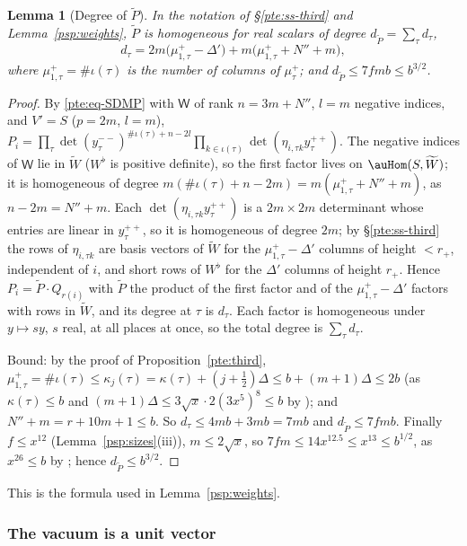 \documentclass[10pt]{amsart}
\newtheorem{lemma}[theorem]{Lemma}
\theoremstyle{definition}
\theoremstyle{remark}
\begin{document}
\begin{lemma}[Degree of $\widetilde P$]\label{psq:degree}
In the notation of \S\ref{pte:ss-third} and Lemma~\ref{psp:weights}, $\widetilde P$ is homogeneous for
real scalars of degree $d_{\widetilde P}=\sum_\tau d_\tau$,
\[
d_\tau=2m\bigl(\mu^+_{1,\tau}-\Delta'\bigr)+m\bigl(\mu^+_{1,\tau}+N''+m\bigr),
\]
where $\mu^+_{1,\tau}=\#\iota(\tau)$ is the number of columns of $\mu^+_\tau$; and $d_{\widetilde P}\le
7fmb\le b^{3/2}$.
\end{lemma}
\begin{proof}
By \eqref{pte:eq-SDMP} with $\mathsf W$ of rank $n=3m+N''$, $l=m$ negative indices, and $V'=S$ ($p=2m$,
$l=m$), $P_i=\prod_\tau\det(y^{--}_\tau)^{\#\iota(\tau)+n-2l}\prod_{k\in\iota(\tau)}\det(\eta_{i,\tau k}
y^{++}_\tau)$. The negative indices of $\mathsf W$ lie in $\widetilde W$ ($W^\flat$ is positive definite),
so the first factor lives on $\auHom(S,\widetilde W)$; it is homogeneous of degree $m(\#\iota(\tau)+
n-2m)=m(\mu^+_{1,\tau}+N''+m)$, as $n-2m=N''+m$. Each $\det(\eta_{i,\tau k}y^{++}_\tau)$ is a $2m\times2m$
determinant whose entries are linear in $y^{++}_\tau$, so it is homogeneous of degree $2m$; by
\S\ref{pte:ss-third} the rows of $\eta_{i,\tau k}$ are basis vectors of $\widetilde W$ for the
$\mu^+_{1,\tau}-\Delta'$ columns of height $<r_+$, independent of $i$, and short rows of $W^\flat$ for the
$\Delta'$ columns of height $r_+$. Hence $P_i=\widetilde P\cdot Q_{r(i)}$ with $\widetilde P$ the product
of the first factor and of the $\mu^+_{1,\tau}-\Delta'$ factors with rows in $\widetilde W$, and its
degree at $\tau$ is $d_\tau$. Each factor is homogeneous under $y\mapsto sy$, $s$ real, at all places at
once, so the total degree is $\sum_\tau d_\tau$.

Bound: by the proof of Proposition~\ref{pte:third}, $\mu^+_{1,\tau}=\#\iota(\tau)\le\kappa_j(\tau)=
\kappa(\tau)+(j+\frac12)\Delta\le b+(m+1)\Delta\le2b$ (as $\kappa(\tau)\le b$ and $(m+1)\Delta\le
3\sqrt x\cdot2(3x^5)^8\le b$ by {\cite[(36)]{P46}}); and $N''+m=r+10m+1\le b$. So $d_\tau\le4mb+3mb=7mb$
and $d_{\widetilde P}\le7fmb$. Finally $f\le x^{12}$ (Lemma~\ref{psp:sizes}(iii)), $m\le2\sqrt x$, so
$7fm\le14x^{12.5}\le x^{13}\le b^{1/2}$, as $x^{26}\le b$ by {\cite[(36)]{P46}}; hence
$d_{\widetilde P}\le b^{3/2}$.
\end{proof}

\noindent This is the formula used in Lemma~\ref{psp:weights}.

\subsubsection{The vacuum is a unit vector}\label{psq:ss-vac}
\end{document}

